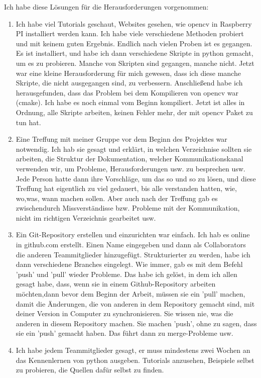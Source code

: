 \begin{itemize}
Ich habe diese Lösungen für die Herausforderungen vorgenommen: 
\begin{enumerate}
	\item Ich habe viel Tutorials geschaut, Websites gesehen, wie opencv in Raspberry PI installiert werden kann. Ich habe viele verschiedene Methoden probiert und mit keinem guten Ergebnis. Endlich nach vielen Proben ist es gegangen. Es ist installiert, und habe ich dann verschiedene Skripte in python gemacht, um es zu probieren. Manche von Skripten sind gegangen, manche nicht. Jetzt war eine kleine Herausforderung für mich gewesen, dass ich diese manche Skripte, die nicht ausgegangen sind, zu verbessern. Anschließend habe ich herausgefunden, dass das Problem bei dem Kompilieren von opencv war (cmake). Ich habe es noch einmal vom Beginn kompiliert. Jetzt ist alles in Ordnung, alle Skripte arbeiten, keinen Fehler mehr, der mit opencv Paket zu tun hat.
	
	\item Eine Treffung mit meiner Gruppe vor dem Beginn des Projektes war notwendig. Ich hab sie gesagt und erklärt, in welchen Verzeichnise sollten sie arbeiten, die Struktur der Dokumentation, welcher Kommunikationskanal verwenden wir, um Probleme, Herausforderungen usw. zu besprechen usw. Jede Person hatte dann ihre Vorschläge, um das so und so zu lösen, und diese Treffung hat eigentlich zu viel gedauert, bis alle verstanden hatten, wie, wo,was, wann machen sollen. Aber auch nach der Treffung gab es zwischendurch Missverständisse bzw. Probleme mit der Kommunikation, nicht im richtigen Verzeichnis gearbeitet usw. 
	
	\item Ein Git-Repository erstellen und einzurichten war einfach. Ich hab es online in github.com erstellt. Einen Name eingegeben und dann als Collaborators die anderen Teammitglieder hinzugefügt. Strukturierter zu werden, habe ich dann verschiedene Branches eingelegt. Wie immer, gab es mit dem Befehl 'push' und 'pull' wieder Probleme. Das habe ich gelöst, in dem ich allen gesagt habe, dass, wenn sie in einem Github-Repository arbeiten möchten,dann bevor dem Beginn der Arbeit, müssen sie ein 'pull' machen, damit die Änderungen, die von anderen in dem Repository gemacht sind, mit deiner Version in Computer zu synchronisieren. Sie wissen nie, was die anderen in diesem Repository machen. Sie machen 'push', ohne zu sagen, dass sie ein 'push' gemacht haben. Das führt dann zu merge-Probleme usw. 
	
	\item Ich habe jedem Teammitglieder gesagt, er muss mindestens zwei Wochen an das Kennenlernen von python ausgeben. Tutorials anzusehen, Beispiele selbst zu probieren, die Quellen dafür selbst zu finden. 
	

\end{enumerate}
\end{itemize}
